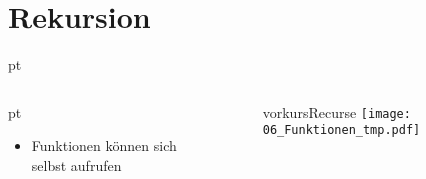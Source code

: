 



\subtitle{Kapitel 6: wie Funktionen funktionieren}
\titlegraphic{
	\begin{columns}
		\begin{column}{4cm}
			\vspace{1.5cm}
			\begin{center}
				{\huge Rekursion}
			\end{center}
		\end{column}
		\begin{column}{4cm}
		\vspace{-5mm}
			\begin{figure}
				\centering
				\includeinvertablegraphics[scale=2.5]{media/tabletop_roleplaying.png}
				\\	\sffamily \tiny Bild: \href{https://xkcd.com/244/}{https://xkcd.com/244/}
			\end{figure}
		\end{column}
	\end{columns}}
\maketitle

\section{Rekursion}
\begin{frame}[t]
	\slidehead

	 pt
	\begin{columns}
		\begin{column}{4.5cm}
			 pt
			\begin{itemize}
				\item Funktionen können sich selbst aufrufen
			\end{itemize}
		\end{column}

		\begin{column}{7cm}
			\begin{figure}
				\ifcsname vorkursRecurse\endcsname
					\texttt{[image: 06\_Funktionen\_tmp.pdf]}
				\fi
			\end{figure}
		\end{column}
	\end{columns}
\end{frame}

